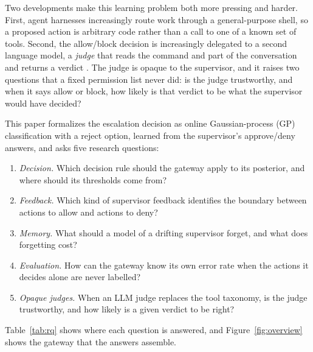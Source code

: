 \documentclass[11pt]{article}
\begin{document}
Two developments make this learning problem both more pressing and harder.
First, agent harnesses increasingly route work through a general-purpose
shell, so a proposed action is arbitrary code rather than a call to one of a
known set of tools. Second, the allow/block decision is increasingly delegated
to a second language model, a \emph{judge} that reads the command and part of
the conversation and returns a verdict \citep{hughes2026automode,openai2026codex}.
The judge is opaque to the supervisor, and it raises two questions that a
fixed permission list never did: is the judge trustworthy, and when it says
allow or block, how likely is that verdict to be what the supervisor would
have decided?

This paper formalizes the escalation decision as online Gaussian-process (GP)
classification with a reject option, learned from the supervisor's
approve/deny answers, and asks five research questions:
\begin{enumerate}[label=\textbf{RQ\arabic*}, leftmargin=3.2em, itemsep=1pt, topsep=3pt]
\item \emph{Decision.} Which decision rule should the gateway apply to its
  posterior, and where should its thresholds come from?
\item \emph{Feedback.} Which kind of supervisor feedback identifies the
  boundary between actions to allow and actions to deny?
\item \emph{Memory.} What should a model of a drifting supervisor forget, and
  what does forgetting cost?
\item \emph{Evaluation.} How can the gateway know its own error rate when the
  actions it decides alone are never labelled?
\item \emph{Opaque judges.} When an LLM judge replaces the tool taxonomy, is
  the judge trustworthy, and how likely is a given verdict to be right?
\end{enumerate}
Table~\ref{tab:rq} shows where each question is answered, and
Figure~\ref{fig:overview} shows the gateway that the answers assemble.
\end{document}
